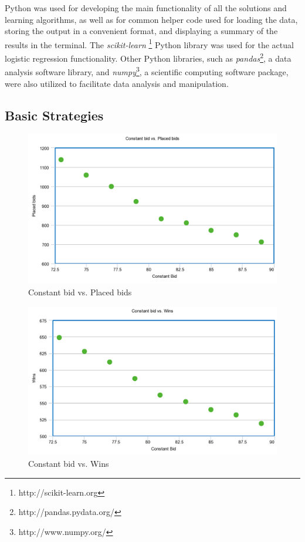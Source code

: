 \documentclass{sig-alternate-05-2015}
\begin{document}
Python was used for developing the main functionality of all the solutions and learning algorithms, as well as for common helper code used for loading the data, storing the output in a convenient format, and displaying a summary of the results in the terminal. The \textit{scikit-learn} \footnote{http://scikit-learn.org} Python library was used for the actual logistic regression functionality. Other Python libraries, such as \textit{pandas}\footnote{http://pandas.pydata.org/}, a data analysis software library, and \textit{numpy}\footnote{http://www.numpy.org/}, a scientific computing software package, were also utilized to facilitate data analysis and manipulation.

\subsection{Basic Strategies}

\begin{figure}
  \includegraphics[width=\linewidth]{Bids.png}
  \caption{Constant bid vs. Placed bids}
  \label{fig:bids}
\end{figure}

\begin{figure}
  \includegraphics[width=\linewidth]{wins.png}
  \caption{Constant bid vs. Wins}
  \label{fig:wins}
\end{figure}
\end{document}
